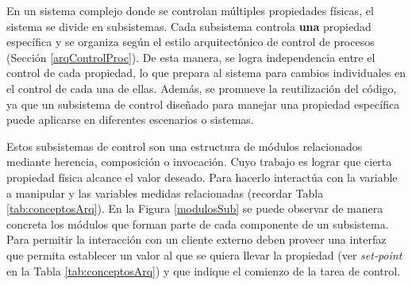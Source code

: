 En un sistema complejo donde se controlan múltiples propiedades físicas, el sistema se divide en subsistemas. Cada subsistema controla \textbf{una} propiedad específica y se organiza según el estilo arquitectónico de control de procesos (Sección \ref{arqControlProc}). De esta manera, se logra independencia entre el control de cada propiedad, lo que prepara al sistema para cambios individuales en el control de cada una de ellas. Además, se promueve la reutilización del código, ya que un subsistema de control diseñado para manejar una propiedad específica puede aplicarse en diferentes escenarios o sistemas.

Estos subsistemas de control son una estructura de módulos relacionados mediante herencia, composición o invocación. Cuyo trabajo es lograr que cierta propiedad física alcance el valor deseado. Para hacerlo interactúa con la variable a manipular y las variables medidas relacionadas (recordar Tabla \ref{tab:conceptosArq}). En la Figura \ref{modulosSub} se puede observar de manera concreta los módulos que forman parte de cada componente de un subsistema. Para permitir la interacción con un cliente externo deben proveer una interfaz que permita establecer un valor al que se quiera llevar la propiedad (ver \textit{set-point} en la Tabla \ref{tab:conceptosArq}) y que indique el comienzo de la tarea de control.

